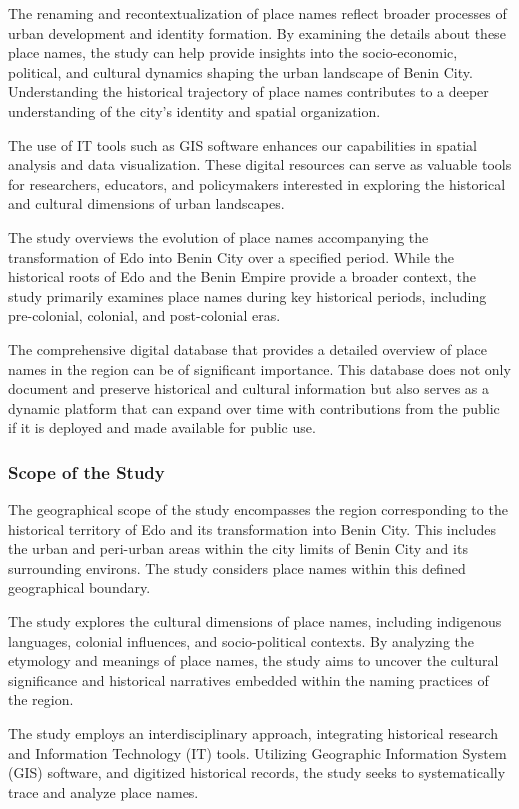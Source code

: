 The renaming and recontextualization of place names reflect broader processes of urban development and identity formation. By examining the details about these place names, the study can help provide insights into the socio-economic, political, and cultural dynamics shaping the urban landscape of Benin City. Understanding the historical trajectory of place names contributes to a deeper understanding of the city's identity and spatial organization.


The use of IT tools such as GIS software enhances our capabilities in spatial analysis and data visualization. These digital resources can serve as valuable tools for researchers, educators, and policymakers interested in exploring the historical and cultural dimensions of urban landscapes.


The study overviews the evolution of place names accompanying the transformation of Edo into Benin City over a specified period. While the historical roots of Edo and the Benin Empire provide a broader context, the study primarily examines place names during key historical periods, including pre-colonial, colonial, and post-colonial eras.


The comprehensive digital database that provides a detailed overview of place names in the region can be of significant importance. This database does not only document and preserve historical and cultural information but also serves as a dynamic platform that can expand over time with contributions from the public if it is deployed and made available for public use.


\subsubsection{Scope of the Study}
The geographical scope of the study encompasses the region corresponding to the historical territory of Edo and its transformation into Benin City. This includes the urban and peri-urban areas within the city limits of Benin City and its surrounding environs. The study considers place names within this defined geographical boundary.


The study explores the cultural dimensions of place names, including indigenous languages, colonial influences, and socio-political contexts. By analyzing the etymology and meanings of place names, the study aims to uncover the cultural significance and historical narratives embedded within the naming practices of the region.


The study employs an interdisciplinary approach, integrating historical research and Information Technology (IT) tools. Utilizing Geographic Information System (GIS) software, and digitized historical records, the study seeks to systematically trace and analyze place names.

